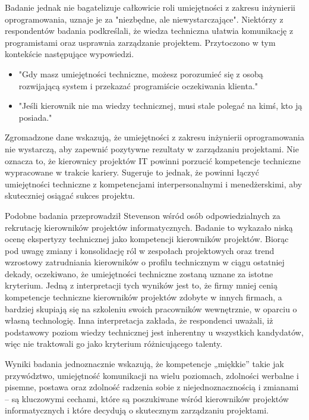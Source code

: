 Badanie jednak nie bagatelizuje całkowicie roli umiejętności z zakresu inżynierii oprogramowania, uznaje je za "niezbędne, ale niewystarczające". Niektórzy z respondentów badania podkreślali, że wiedza techniczna ułatwia komunikację z programistami oraz usprawnia zarządzanie projektem. Przytoczono w tym kontekście następujące wypowiedzi.
\begin{itemize}
    \item"Gdy masz umiejętności techniczne, możesz porozumieć się z osobą rozwijającą system i przekazać programiście oczekiwania klienta."
    \item"Jeśli kierownik nie ma wiedzy technicznej, musi stale polegać na kimś, kto ją posiada."    
\end{itemize}

Zgromadzone dane wskazują, że umiejętności z zakresu inżynierii oprogramowania nie wystarczą, aby zapewnić pozytywne rezultaty w zarządzaniu projektami. Nie oznacza to, że kierownicy projektów IT powinni porzucić kompetencje techniczne wypracowane w trakcie kariery. Sugeruje to jednak, że powinni łączyć umiejętności techniczne z kompetencjami interpersonalnymi i menedżerskimi, aby skuteczniej osiągać sukces projektu.\autocite{silva2015project}


Podobne badania przeprowadził Stevenson wśród osób odpowiedzialnych za rekrutację kierowników projektów informatycznych.\autocite{stevenson2010pm} Badanie to wykazało niską ocenę ekspertyzy technicznej jako kompetencji kierowników projektów. Biorąc pod uwagę zmiany i konsolidację ról w zespołach projektowych oraz trend wzrostowy zatrudniania kierowników o profilu technicznym w ciągu ostatniej dekady, oczekiwano, że umiejętności techniczne zostaną uznane za istotne kryterium. Jedną z interpretacji tych wyników jest to, że firmy mniej cenią kompetencje techniczne kierowników projektów zdobyte w innych firmach, a bardziej skupiają się na szkoleniu swoich pracowników wewnętrznie, w oparciu o własną technologię. Inna interpretacja zakłada, że respondenci uważali, iż podstawowy poziom wiedzy technicznej jest inherentny u wszystkich kandydatów, więc nie traktowali go jako kryterium różnicującego talenty.

Wyniki badania jednoznacznie wskazują, że kompetencje „miękkie” takie jak przywództwo, umiejętność komunikacji na wielu poziomach, zdolności werbalne i pisemne, postawa oraz zdolność radzenia sobie z niejednoznacznością i zmianami – są kluczowymi cechami, które są poszukiwane wśród kierowników projektów informatycznych i które decydują o skutecznym zarządzaniu projektami.\autocite{stevenson2010pm}

